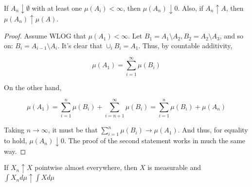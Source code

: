     \begin{theorem}
        If $A_n \downarrow \emptyset$ with at least one $\mu(A_i) < \infty$, then $\mu(A_n) \downarrow 0$. 
        Also, if $A_n \uparrow A$, then $\mu(A_n) \uparrow \mu(A)$.
    \end{theorem}

    \begin{proof}
        Assume WLOG that $\mu(A_1) < \infty$. Let $B_1 = A_1 \setminus A_2, B_2 = A_2 \setminus A_3$, and so on: $B_i = A_{i-1} \setminus A_i$. 
        It's clear that $\cup_i B_i = A_1$. Thus, by countable additivity,
        
        \[ \mu(A_1) = \sum_{i=1}^\infty \mu(B_i) \]

        On the other hand, 

        \[ \mu(A_1) = \sum_{i=1}^n \mu(B_i) + \sum_{i=n+1}^\infty \mu(B_i) = \sum_{i=1}^n \mu(B_i) + \mu(A_n) \]

        Taking $n \to \infty$, it must be that $\sum_{i=1}^n \mu(B_i) \to \mu(A_1)$. And thus, for equality to hold, 
        $\mu(A_n) \downarrow 0$. The proof of the second statement works in much the same way.
    \end{proof}

    \begin{theorem}
        If $X_n \uparrow X$ pointwise almost everywhere, then $X$ is measurable and $\int X_n d\mu \uparrow \int X d\mu$
    \end{theorem}

